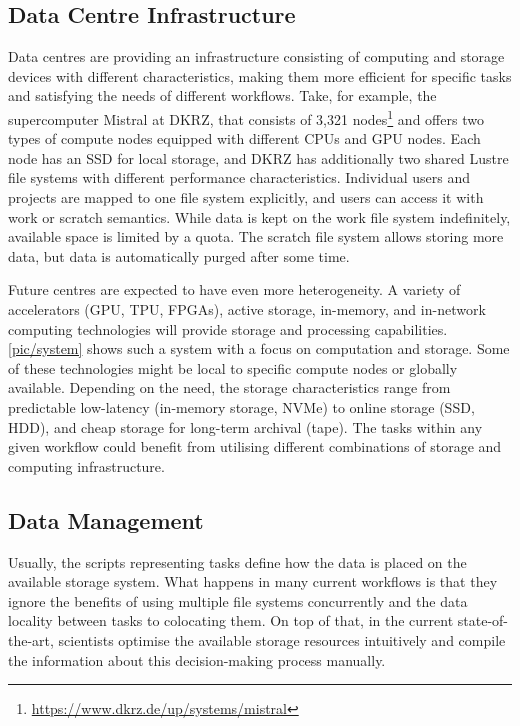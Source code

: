 \documentclass{superfri}
\begin{document}
\subsection{Data Centre Infrastructure}

Data centres are providing an infrastructure consisting of computing and storage devices with different characteristics, making them more efficient for specific tasks and satisfying the needs of different workflows.
Take, for example, the supercomputer Mistral at DKRZ, that consists of 3,321 nodes\footnote{\url{https://www.dkrz.de/up/systems/mistral}} and offers two types of compute nodes equipped with different CPUs and GPU nodes.
Each node has an SSD for local storage, and DKRZ has additionally two shared Lustre file systems with different performance characteristics.
Individual users and projects are mapped to one file system explicitly, and users can access it with work or scratch semantics.
While data is kept on the work file system indefinitely, available space is limited by a quota.
The scratch file system allows storing more data, but data is automatically purged after some time.

Future centres are expected to have even more heterogeneity. A variety of accelerators (GPU, TPU, FPGAs), active storage, in-memory, and in-network computing technologies will provide storage and processing capabilities.
\cref{pic/system} shows such a system with a focus on computation and storage.
Some of these technologies might be local to specific compute nodes or globally available.
Depending on the need, the storage characteristics range from predictable low-latency (in-memory storage, NVMe) to online storage (SSD, HDD), and cheap storage for long-term archival (tape).
The tasks within any given workflow could benefit from utilising different combinations of storage and computing infrastructure.

\subsection{Data Management}
\label{sec:datamanagement}

Usually, the scripts representing tasks define how the data is placed on the available storage system.
What happens in many current workflows is that they ignore the benefits of using multiple file systems concurrently and the data locality between tasks to colocating them.
On top of that, in the current state-of-the-art, scientists optimise the available storage resources intuitively and compile the information about this decision-making process manually.
\end{document}
